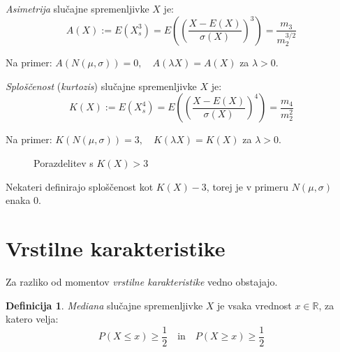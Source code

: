 \documentclass[12pt]{book}
\def\n{\noindent}
\def\s{\vspace{10pt}}
\theoremstyle{definition}
\newtheorem{definicija}{Definicija}
\theoremstyle{plain}
\theoremstyle{plain}
\theoremstyle{plain}
\theoremstyle{remark}
\begin{document}
\s 

\n \emph{Asimetrija} slučajne spremenljivke $X$ je: 
$$
A(X):=E\left(X_s^3\right)=E\left(\left(\frac{X-E(X)}{\sigma(X)}\right)^3\right)=\frac{m_3}{m_2^{3/2}}
$$
 
Na primer: $A(N(\mu, \sigma))=0, \quad A(\lambda X)=A(X)$ za $\lambda >0$.

\s 

\n \emph{Sploščenost} (\emph{kurtozis}) slučajne spremenljivke $X$ je:
$$
K(X):=E\left(X_s^4\right)=E\left(\left(\frac{X-E(X)}{\sigma(X)}\right)^4\right)=\frac{m_4}{m_2^2}
$$

Na primer: $K(N(\mu, \sigma))=3, \quad K(\lambda X)=K(X)$ za $\lambda > 0$.

\begin{figure}[H]
    \centering

    \caption{Porazdelitev s $K(X)>3$}
    \label{fig:24}
\end{figure}

\n Nekateri definirajo sploščenost kot $K(X) - 3$, torej je v primeru $N(\mu, \sigma)$ enaka 0. 

\section{Vrstilne karakteristike}

Za razliko od momentov \emph{vrstilne karakteristike} vedno obstajajo.

\begin{definicija}
    \emph{Mediana} slučajne spremenljivke $X$ je vsaka vrednost $x \in \mathbb{R}$, za katero velja:
    $$
    P(X \leq x) \geq \frac{1}{2} \quad \text{in} \quad P(X \geq x) \geq\frac{1}{2}
    $$    
\end{definicija}
\end{document}
